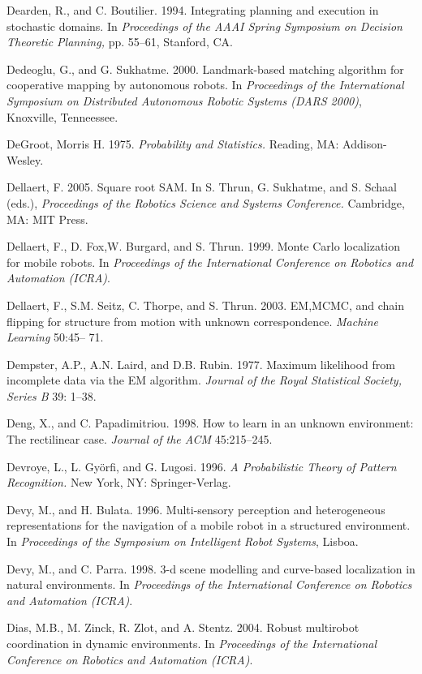\documentclass[10pt,a4paper]{article}
\begin{document}
Dearden, R., and C. Boutilier. 1994. Integrating planning and execution in stochastic
domains. In \textit{Proceedings of the AAAI Spring Symposium on Decision Theoretic Planning,}
pp. 55–61, Stanford, CA.

Dedeoglu, G., and G. Sukhatme. 2000. Landmark-based matching algorithm for
cooperative mapping by autonomous robots. In \textit{Proceedings of the International
Symposium on Distributed Autonomous Robotic Systems (DARS 2000)}, Knoxville, Tenneessee.

DeGroot, Morris H. 1975. \textit{Probability and Statistics.} Reading, MA: Addison-Wesley.

Dellaert, F. 2005. Square root SAM. In S. Thrun, G. Sukhatme, and S. Schaal (eds.), \textit{Proceedings
of the Robotics Science and Systems Conference.} Cambridge, MA: MIT Press.

Dellaert, F., D. Fox,W. Burgard, and S. Thrun. 1999. Monte Carlo localization for mobile
robots. In \textit{Proceedings of the International Conference on Robotics and Automation
(ICRA)}.

Dellaert, F., S.M. Seitz, C. Thorpe, and S. Thrun. 2003. EM,MCMC, and chain flipping
for structure from motion with unknown correspondence. \textit{Machine Learning} 50:45–
71.

Dempster, A.P., A.N. Laird, and D.B. Rubin. 1977. Maximum likelihood from incomplete
data via the EM algorithm. \textit{Journal of the Royal Statistical Society, Series B} 39:
1–38.

Deng, X., and C. Papadimitriou. 1998. How to learn in an unknown environment:
The rectilinear case. \textit{Journal of the ACM} 45:215–245.

Devroye, L., L. Györfi, and G. Lugosi. 1996. \textit{A Probabilistic Theory of Pattern Recognition.}
New York, NY: Springer-Verlag.

Devy, M., and H. Bulata. 1996. Multi-sensory perception and heterogeneous representations
for the navigation of a mobile robot in a structured environment. In
\textit{Proceedings of the Symposium on Intelligent Robot Systems}, Lisboa.

Devy, M., and C. Parra. 1998. 3-d scene modelling and curve-based localization in
natural environments. In \textit{Proceedings of the International Conference on Robotics and
Automation (ICRA)}.

Dias, M.B., M. Zinck, R. Zlot, and A. Stentz. 2004. Robust multirobot coordination in
dynamic environments. In \textit{Proceedings of the International Conference on Robotics and
Automation (ICRA)}.
\end{document}

